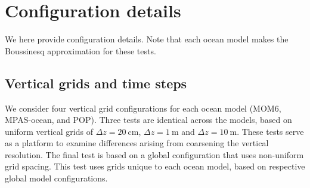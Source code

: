 \section{Configuration details}
\label{section:configuration-details-WSwPSBF}

We here provide configuration details.  Note that each ocean model
makes the Boussinesq approximation for these tests.


\subsection{Vertical grids and time steps}

We consider four vertical grid configurations for each ocean model
(MOM6, MPAS-ocean, and POP).  Three tests are identical across the
models, based on uniform vertical grids of $\Delta z = 20~\mbox{cm}$,
$\Delta z = 1~\mbox{m}$ and $\Delta z = 10~\mbox{m}$.  These tests
serve as a platform to examine differences arising from coarsening the
vertical resolution.  The final test is based on a global
configuration that uses non-uniform grid spacing.  This test uses
grids unique to each ocean model, based on respective global model
configurations.

\begin{table}[h!t]
\caption{Model vertical grid spacing, bottom depth,  and time steps for the CVMix column tests.}
\label{table:kpp-model-configuration}
\end{table}


